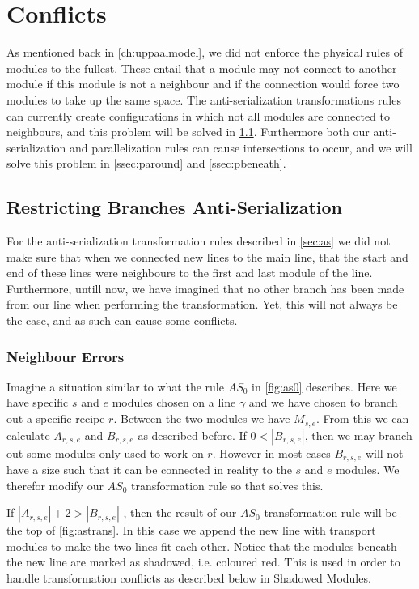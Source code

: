 \section{Conflicts}\label{ssec:conflicts}
As mentioned back in \cref{ch:uppaalmodel}, we did not enforce the physical rules of modules to the fullest. These entail that a module may not connect to another module if this module is not a neighbour and if the connection would force two modules to take up the same space. The anti-serialization transformations rules can currently create configurations in which not all modules are connected to neighbours, and this problem will be solved in \cref{ssec:restrictbranch}. Furthermore both our anti-serialization and parallelization rules can cause intersections to occur, and we will solve this problem in \cref{ssec:paround} and \cref{ssec:pbeneath}.


\subsection{Restricting Branches Anti-Serialization}\label{ssec:restrictbranch}
For the anti-serialization transformation rules described in \cref{sec:as} we did not make sure that when we connected new lines to the main line, that the start and end of these lines were neighbours to the first and last module of the line. Furthermore, untill now, we have imagined that no other branch has been made from our line when performing the transformation. Yet, this will not always be the case, and as such can cause some conflicts.

\subsubsection{Neighbour Errors}
Imagine a situation similar to what the rule $AS_0$ in \cref{fig:as0} describes. Here we have specific $s$ and $e$ modules chosen on a line $\gamma$ and we have chosen to branch out a specific recipe $r$. Between the two modules we have $M_{s,e}$. From this we can calculate $A_{r,s,e}$ and $B_{r,s,e}$ as described before. If $0 < |B_{r,s,e}|$, then we may branch out some modules only used to work on $r$. However in  most cases $B_{r,s,e}$ will not have a size such that it can be connected in reality to the $s$ and $e$ modules. We therefor modify our $AS_0$ transformation rule so that solves this.

If $|A_{r,s,e}| + 2 > |B_{r,s,e}|$ , then the result of our $AS_0$ transformation rule will be the top of \cref{fig:astrans}. In this case we append the new line with transport modules to make the two lines fit each other. Notice that the modules beneath the new line are marked as shadowed, i.e. coloured red. This is used in order to handle transformation conflicts as described below in Shadowed Modules.



